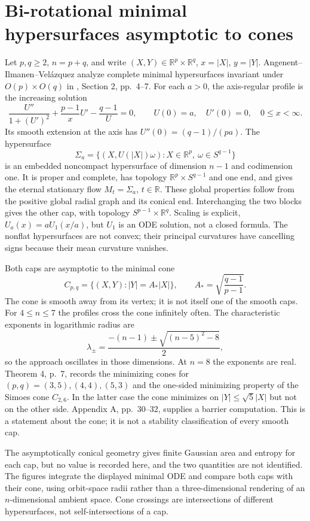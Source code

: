 \chapter{Bi-rotational minimal hypersurfaces asymptotic to cones}\label{sec:catalogue-aiv-minimal}
\begin{example}\label{ex:catalogue-aiv-minimal}
Let $p,q\geq2$, $n=p+q$, and write $(X,Y)\in\mathbb R^p\times\mathbb R^q$, $x=|X|$, $y=|Y|$. Angenent--Ilmanen--Vel\'azquez analyze complete minimal hypersurfaces invariant under $O(p)\times O(q)$ in \cite{CatAIV2002}, Section 2, pp.~4--7. For each $a>0$, the axis-regular profile is the increasing solution
\[
 \frac{U''}{1+(U')^2}+\frac{p-1}{x}U'-\frac{q-1}{U}=0,
 \qquad U(0)=a,\quad U'(0)=0,\quad 0\leq x<\infty.
\]
Its smooth extension at the axis has $U''(0)=(q-1)/(pa)$. The hypersurface
\[
 \Sigma_a=\{(X,U(|X|)\omega):X\in\mathbb R^p,\ \omega\in S^{q-1}\}
\]
is an embedded noncompact hypersurface of dimension $n-1$ and codimension one. It is proper and complete, has topology $\mathbb R^p\times S^{q-1}$ and one end, and gives the eternal stationary flow $M_t=\Sigma_a$, $t\in\mathbb R$. These global properties follow from the positive global radial graph and its conical end. Interchanging the two blocks gives the other cap, with topology $S^{p-1}\times\mathbb R^q$. Scaling is explicit, $U_a(x)=aU_1(x/a)$, but $U_1$ is an ODE solution, not a closed formula. The nonflat hypersurfaces are not convex; their principal curvatures have cancelling signs because their mean curvature vanishes.

Both caps are asymptotic to the minimal cone
\[
 C_{p,q}=\{(X,Y):|Y|=A_*|X|\},\qquad
 A_*=\sqrt{\frac{q-1}{p-1}}.
\]
The cone is smooth away from its vertex; it is not itself one of the smooth caps. For $4\leq n\leq7$ the profiles cross the cone infinitely often. The characteristic exponents in logarithmic radius are
\[
 \lambda_\pm=\frac{-(n-1)\pm\sqrt{(n-5)^2-8}}2,
\]
so the approach oscillates in those dimensions. At $n=8$ the exponents are real. Theorem 4, p.~7, records the minimizing cones for $(p,q)=(3,5),(4,4),(5,3)$ and the one-sided minimizing property of the Simoes cone $C_{2,6}$. In the latter case the cone minimizes on $|Y|\leq\sqrt5|X|$ but not on the other side. Appendix A, pp.~30--32, supplies a barrier computation. This is a statement about the cone; it is not a stability classification of every smooth cap.

The asymptotically conical geometry gives finite Gaussian area and entropy for each cap, but no value is recorded here, and the two quantities are not identified. The figures integrate the displayed minimal ODE and compare both caps with their cone, using orbit-space radii rather than a three-dimensional rendering of an $n$-dimensional ambient space. Cone crossings are intersections of different hypersurfaces, not self-intersections of a cap.
\end{example}

